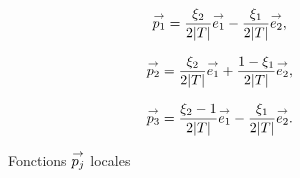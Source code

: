     \begin{figure}[!htb]
      \begin{minipage}{0.329\textwidth}
          \begin{center}
            \begin{tikzpicture}[scale=1]
              
            \end{tikzpicture}
          \end{center}
          \begin{equation*}
            \vect{p_1}=\frac{\xi_2}{2|T|}\vect{e_1}-\frac{\xi_1}{2|T|}\vect{e_2},
          \end{equation*}
      \end{minipage}
      \begin{minipage}{0.329\textwidth}
          \begin{center}
            \begin{tikzpicture}[scale=1]
              
            \end{tikzpicture}
             \begin{equation*}
              \vect{p_2}= \frac{\xi_2}{2|T|}\vect{e_1} + \frac{1-\xi_1}{2|T|}\vect{e_2},
            \end{equation*}
          \end{center}
      \end{minipage}
      \begin{minipage}{0.329\textwidth}
          \begin{center}
            \begin{tikzpicture}[scale=1]
              
            \end{tikzpicture}
            \begin{equation*}
              \vect{p_3}= \frac{\xi_2-1}{2|T|}\vect{e_1} - \frac{\xi_1}{2|T|}\vect{e_2}.
            \end{equation*}
          \end{center}
      \end{minipage}
      \caption[Fonctions de Nédélec]{Fonctions \(\pj\) locales}
      \label{fig:form_int:fon_base:p}
    \end{figure}

